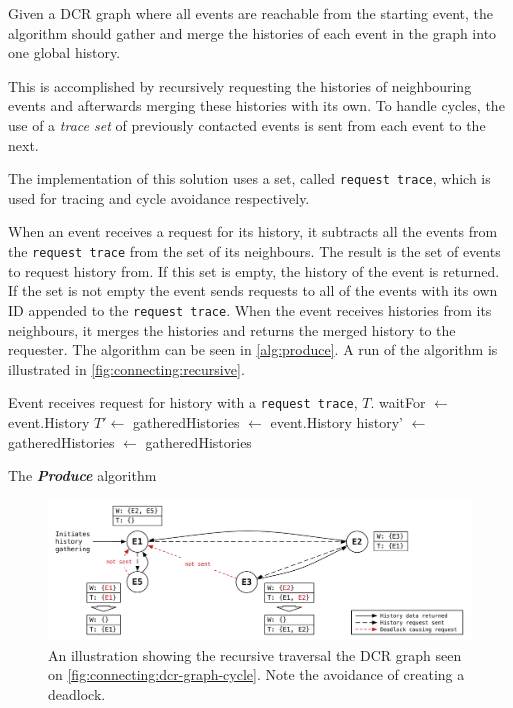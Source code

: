 	\newpar Given a DCR graph where all events are reachable from the starting event, the algorithm should gather and merge the histories of each event in the graph into one global history.
	
	This is accomplished by recursively requesting the histories of neighbouring events and afterwards merging these histories with its own. To handle cycles, the use of a \textit{trace set} of previously contacted events is sent from each event to the next.
	
	\newpar The implementation of this solution uses a set, called \texttt{request trace}, which is used for tracing and cycle avoidance respectively.
	
	When an event receives a request for its history, it subtracts all the events from the \texttt{request trace} from the set of its neighbours. The result is the set of events to request history from. If this set is empty, the history of the event is returned. If the set is not empty the event sends requests to all of the events with its own ID appended to the \texttt{request trace}. When the event receives histories from its neighbours, it merges the histories and returns the merged history to the requester. The algorithm can be seen in \autoref{alg:produce}. A run of the algorithm is illustrated in \autoref{fig:connecting:recursive}.
	
	\begin{algorithm}
		\begin{algorithmic}
			\State Event receives request for history with a \texttt{request trace}, $T$.
			\State
				\State waitFor $\gets$ 
					\Return event.History
				\Else
					\State $T'\gets$
					\State
					\State gatheredHistories $\leftarrow$ event.History
						\State history' $\leftarrow$ 
						\State gatheredHistories $\leftarrow$ 
					\EndFor
					\State\Return gatheredHistories
				\EndIf
			\EndFunction
		\end{algorithmic}
		\caption{The \textit{\textbf{Produce}} algorithm}
		\label{alg:produce}
	\end{algorithm}
	
	\begin{figure}[H]
		\centering
		\includegraphics[width=\textwidth]{4connect/images/recursive.pdf}
		\caption{An illustration showing the recursive traversal the DCR graph seen on \autoref{fig:connecting:dcr-graph-cycle}. Note the avoidance of creating a deadlock.}
		\label{fig:connecting:recursive}
	\end{figure}
	
